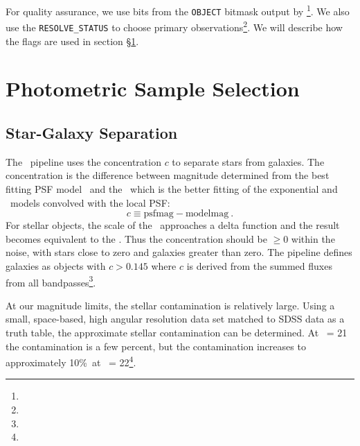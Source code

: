 \documentclass[12pt,preprint]{aastex}
\newcommand{\contamworst}{10\%}
\begin{document}
For quality assurance, we use bits from the \texttt{OBJECT} bitmask output by
\photo \footnote{\DRateflags}.    We also use the \texttt{RESOLVE\_STATUS} to
choose primary observations\footnote{\DRateresolve}.  We will describe how the
flags are used in section \S \ref{sec:select}.

    

\section{Photometric Sample Selection} \label{sec:select}

\subsection{Star-Galaxy Separation} \label{sec:sg}

The \photo\ pipeline uses the concentration $c$ to separate stars from
galaxies.  The concentration is the difference between magnitude determined
from the best fitting PSF model \psfmag\ and the \modelmag\, which is
the better fitting of the exponential and \devauc\ models convolved
with the local PSF:
\begin{equation}
c \equiv \textrm{psfmag} - \textrm{modelmag}~.
\end{equation}
For stellar objects, the scale of the \modelmag\ approaches a delta function and
the result becomes equivalent to the \psfmag.  Thus the concentration should be
$\ge 0$ within the noise, with stars close to zero and galaxies greater than
zero.  The pipeline defines galaxies as objects with $c > 0.145$ where $c$ is
derived from the summed fluxes from all bandpasses\footnote{\DRateclass}.  

At our magnitude limits, the stellar contamination is relatively large.  Using
a small, space-based, high angular resolution data set matched to SDSS data as
a truth table, the approximate stellar contamination can be determined.  At
\rmag\ = 21 the contamination is a few percent, but the contamination increases
to approximately \contamworst\ at \rmag\ = 22\footnote{\DRsevsg}.  
\end{document}
